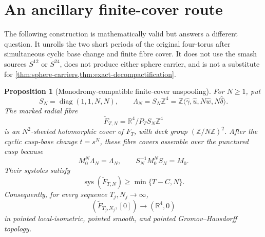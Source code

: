 \documentclass[11pt,letterpaper]{article}
\numberwithin{equation}{section}
\newtheorem{proposition}[theorem]{Proposition}
\theoremstyle{definition}
\theoremstyle{remark}
\newcommand{\R}{\mathbb R}
\newcommand{\Z}{\mathbb Z}
\newcommand{\sys}{\operatorname{sys}}
\begin{document}
\section{An ancillary finite-cover route}
\label{sec:ancillary-finite-cover}

The following construction is mathematically valid but answers a
different question.  It unrolls the two short periods of the original
four-torus after simultaneous cyclic base change and finite fibre cover.
It does not use the smash sources \(S^{12}\) or \(S^{24}\), does not
produce either sphere carrier, and is not a substitute for
\cref{thm:sphere-carriers,thm:exact-decompactification}.

\begin{proposition}[Monodromy-compatible finite-cover unspooling]
\label{prop:finite-cover-unspooling}
For \(N\geq1\), put
\[
 S_N=\operatorname{diag}(1,1,N,N),\qquad
 \Lambda_N=S_N\Z^4
 =\Z\langle\widehat\gamma,\widehat u,
 N\widehat w,N\widehat\delta\rangle.
\]
The marked radial fibre
\[
 \widetilde F_{T,N}=\R^4/P_TS_N\Z^4
\]
is an \(N^2\)-sheeted holomorphic cover of \(F_T\), with deck group
\((\Z/N\Z)^2\).  After the cyclic cusp-base change \(t=s^N\), these
fibre covers assemble over the punctured cusp because
\begin{equation}
 M_0^N\Lambda_N=\Lambda_N,\qquad
 S_N^{-1}M_0^NS_N=M_0.
 \label{eq:finite-cover-conjugacy}
\end{equation}
Their systoles satisfy
\begin{equation}
 \sys(\widetilde F_{T,N})\geq\min\{T-C,N\}.
 \label{eq:finite-cover-systole}
\end{equation}
Consequently, for every sequence \(T_j,N_j\to\infty\),
\[
 (\widetilde F_{T_j,N_j},[0])
 \longrightarrow(\R^4,0)
\]
in pointed local-isometric, pointed smooth, and pointed
Gromov--Hausdorff topology.
\end{proposition}
\end{document}
